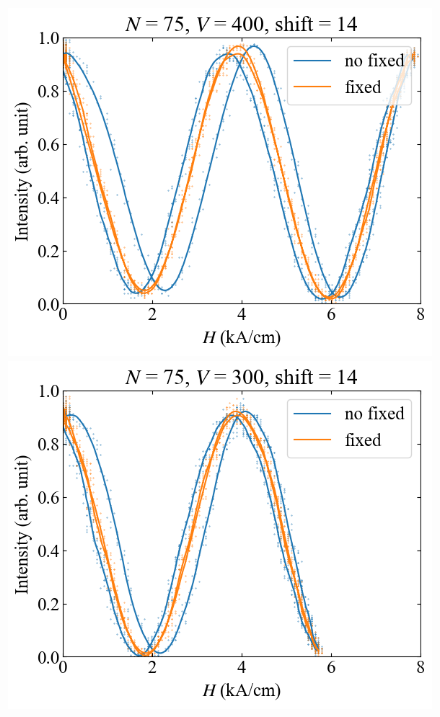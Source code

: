 \documentclass[9pt,dvipdfmx,a4paper]{jsarticle}
\begin{document}
\begin{figure}[H]
    \centering
    \begin{minipage}[t]{0.24\columnwidth}
        \centering
        \includegraphics[width = \columnwidth]{xy/09.png}
    \end{minipage}
    \hfill
    \begin{minipage}[t]{0.24\columnwidth}
        \centering
        \includegraphics[width = \columnwidth]{xy/10.png}
    \end{minipage}
    \hfill
    \begin{minipage}[t]{0.24\columnwidth}

\end{minipage}
\end{figure}
\end{document}

